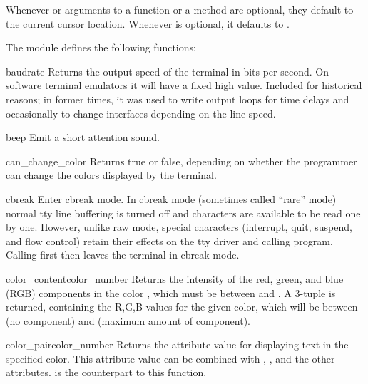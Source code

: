 Whenever  or  arguments to a function
or a method are optional, they default to the current cursor location.
Whenever  is optional, it defaults to .

The module  defines the following functions:

\begin{funcdesc}{baudrate}{}
Returns the output speed of the terminal in bits per second.  On
software terminal emulators it will have a fixed high value.
Included for historical reasons; in former times, it was used to 
write output loops for time delays and occasionally to change
interfaces depending on the line speed.
\end{funcdesc}

\begin{funcdesc}{beep}{}
Emit a short attention sound.
\end{funcdesc}

\begin{funcdesc}{can_change_color}{}
Returns true or false, depending on whether the programmer can change
the colors displayed by the terminal.
\end{funcdesc}

\begin{funcdesc}{cbreak}{}
Enter cbreak mode.  In cbreak mode (sometimes called ``rare'' mode)
normal tty line buffering is turned off and characters are available
to be read one by one.  However, unlike raw mode, special characters
(interrupt, quit, suspend, and flow control) retain their effects on
the tty driver and calling program.  Calling first 
then  leaves the terminal in cbreak mode.
\end{funcdesc}

\begin{funcdesc}{color_content}{color_number}
Returns the intensity of the red, green, and blue (RGB) components in
the color , which must be between  and
.  A 3-tuple is returned, containing the R,G,B values
for the given color, which will be between  (no component) and
 (maximum amount of component).
\end{funcdesc}

\begin{funcdesc}{color_pair}{color_number}
Returns the attribute value for displaying text in the specified
color.  This attribute value can be combined with
, , and the other
 attributes.   is the
counterpart to this function.
\end{funcdesc}

